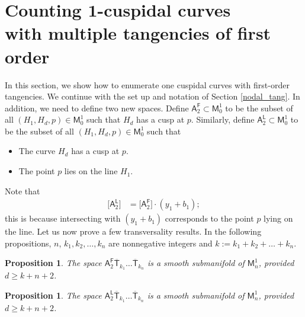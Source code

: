 \documentclass[pdftex]{sigma}
\numberwithin{equation}{section}
\newtheorem{prp}[thm]{Proposition}
\begin{document}
\section[Counting 1-cuspidal curves with multiple tangencies of first order]{Counting $\boldsymbol{ 1}$-cuspidal curves\\ with multiple tangencies of first order}
\label{Cuspidal_tang}
In this section, we show how to enumerate one cuspidal curves with first-order tangencies.
We continue with the set up and notation of Section \ref{nodal_tang}.
In addition, we need to define two new spaces.
Define
$\mathsf{A}_2^{\mathsf{F}} \subset \mathsf{M}^1_0$ to be the subset of all
$(H_1, H_d, p) \in \mathsf{M}^1_0$ such that
$H_d$ has a cusp at $p$.
Similarly, define
$\mathsf{A}_2^{\mathsf{L}} \subset \mathsf{M}^1_0$ to be the subset of all
$(H_1, H_d, p) \in \mathsf{M}^1_0$ such that
\begin{itemize}\itemsep=0pt
\item The curve $H_d$ has a cusp at $p$.
\item The point $p$ lies on the line $H_1$.
\end{itemize}
Note that
\begin{align}
\bigl[\mathsf{A}_2^{\mathsf{L}}\bigr] &  =  \bigl[\mathsf{A}_2^{\mathsf{F}}\bigr]\cdot (y_1 + b_1);
\label{a2_line_cycle}
\end{align}
this is because intersecting with $(y_1+b_1)$ corresponds to the point $p$ lying on the line.
Let us now prove a few transversality results.
In the following propositions,
$n$, $k_1, k_2,\dots, k_{n}$ are nonnegative integers
and
$k := k_1+k_2+\dots +k_n$.

\begin{prp}
\label{prp_smth_mfld_with_A2f_ag}
The space
$\mathsf{A}^{\mathsf{F}}_2\overline{\mathsf{T}}_{k_1}\dots \overline{\mathsf{T}}_{k_n}$
is a smooth submanifold of $\mathsf{M}_{n}^{1}$, provided $d \geq k+n+2$.
\end{prp}

\begin{prp}
\label{prp_smth_mfld_with_A2L_ag}
The space
$\mathsf{A}^{\mathsf{L}}_2\overline{\mathsf{T}}_{k_1}\dots \overline{\mathsf{T}}_{k_n}$
is a smooth submanifold of $\mathsf{M}_{n}^{1}$, provided $d \geq k+n+2$.
\end{prp}
\end{document}
